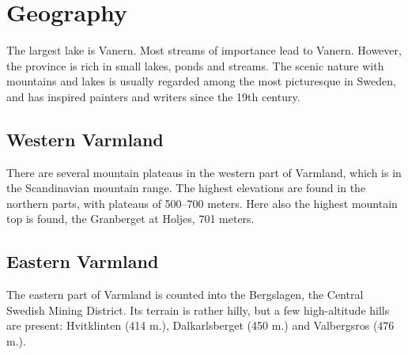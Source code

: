\documentclass[a4paper, 11pt]{article}
\begin{document}
\section{Geography}
The largest lake is Vanern. Most streams of importance lead to Vanern. However, the province is rich in small lakes, ponds and streams. The scenic nature with mountains and lakes is usually regarded among the most picturesque in Sweden, and has inspired painters and writers since the 19th century.

\subsection{Western Varmland}
There are several mountain plateaus in the western part of Varmland, which is in the Scandinavian mountain range. The highest elevations are found in the northern parts, with plateaus of 500–700 meters. Here also the highest mountain top is found, the Granberget at Holjes, 701 meters.

\subsection{Eastern Varmland}
The eastern part of Varmland is counted into the Bergslagen, the Central Swedish Mining District. Its terrain is rather hilly, but a few high-altitude hills are present: Hvitklinten (414 m.), Dalkarlsberget (450 m.) and Valbergsros (476 m.).


\end{document}
